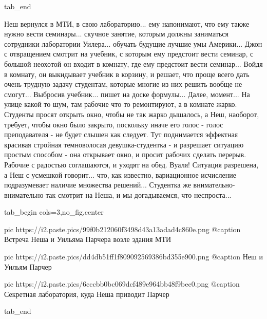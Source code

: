   tab_end
\fi

Неш вернулся в МТИ, в свою лабораторию... ему напонимают, что ему также нужно
вести семинары... скучное занятие, которым должны заниматься сотрудники
лаборатории Уилера...  обучать будущие лучшие умы Америки... Джон с отвращением
смотрит на учебник, с которым ему предстоит вести семинар, с большой неохотой
он входит в комнату, где ему предстоит вести семинар... Войдя в комнату, он
выкидывает учебник в корзину, и решает, что проще всего дать очень трудную
задачу студентам, которые многие из них решить вообще не смогут... Выбросив
учебник...  пишет на доске формулы... Далее, момент... На улице какой то шум,
там рабочие что то ремонтируют, а в комнате жарко. Студенты просят открыть
окно, чтобы не так жарко дышалось, а Неш, наоборот, требует, чтобы окно было
закрыто, поскольку иначе его голос - голос преподавателя - не будет слышен как
следует.  Тут поднимается эффектная красивая стройная темноволосая
девушка-студентка - и разрешает ситуацию простым способом - она открывает окно,
и просит рабочих сделать перерыв. Рабочие с радостью соглашаются, и уходят на
обед. Вуаля! Ситуация разрешена, а Неш с усмешкой говорит... что, как известно,
вариационное исчисление подразумевает наличие множества решений... Студентка же
внимательно-внимательно так смотрит на Неша, и мы догадываемся, что
неспроста...


\ifcmt
  tab_begin cols=3,no_fig,center

     pic https://i2.paste.pics/99f0b212060f3498d43a13adad4c860e.png
		 @caption Встреча Неша и Уильяма Парчера возле здания МТИ

		 pic https://i2.paste.pics/dd4db51ff1f809092569386bd355e900.png
		 @caption Неш и Уильям Парчер

		 pic https://i2.paste.pics/6cccbb0bc069dcf489e964bb48f9bec0.png
		 @caption Секретная лаборатория, куда Неша приводит Парчер

  tab_end
\fi

